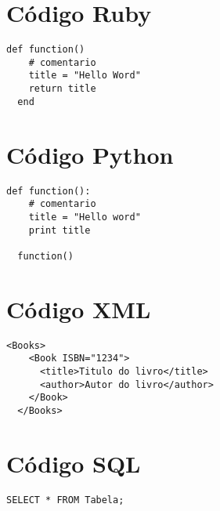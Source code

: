 \section{Código Ruby}

\begin{lstlisting}[style=Ruby, title=Ruby]
  def function()
    # comentario
    title = "Hello Word"
    return title
  end
\end{lstlisting}

\section{Código Python}

\begin{lstlisting}[style=Python, title=Python]
  def function():
    # comentario
    title = "Hello word"
    print title

  function()
\end{lstlisting}

\section{Código XML}

\begin{lstlisting}[style=XML, title=XML]
  <Books>
    <Book ISBN="1234">
      <title>Titulo do livro</title>
      <author>Autor do livro</author>
    </Book>
  </Books>
\end{lstlisting}

\section{Código SQL}

\begin{lstlisting}[style=SQL, title=SQL]
  SELECT * FROM Tabela;
\end{lstlisting}
